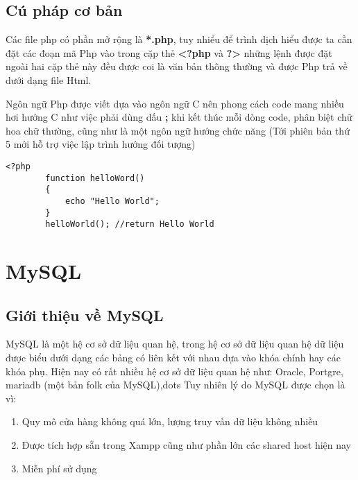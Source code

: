 \subsection{Cú pháp cơ bản}
Các file php có phần mở rộng là \textbf{*.php}, tuy nhiểu để trình dịch hiểu được ta cần đặt các đoạn mã Php vào trong cặp thẻ \textbf{<?php} và \textbf{?>} những lệnh được đặt ngoài hai cặp thẻ này đều được coi là văn bản thông thường và được Php trả về dưới dạng file Html.\par
Ngôn ngữ Php được viết dựa vào ngôn ngữ C nên phong cách code mang nhiều hơi hướng C như việc phải dùng dấu \textbf{;} khi kết thúc mỗi dòng code, phân biệt chữ hoa chữ thường, cũng như là một ngôn ngữ hướng chức năng (Tới phiên bản thứ 5 mới hỗ trợ việc lập trình hướng đối tượng)
\lstset{language=Php}
\begin{center}
	\vspace{-2em}
	\begin{lstlisting}[frame=single]
    <?php
        function helloWord()
        {
            echo "Hello World";
        }
        helloWorld(); //return Hello World
\end{lstlisting}
\end{center}
\section{MySQL}
\subsection{Giới thiệu về MySQL}
MySQL là một hệ cơ sở dữ liệu quan hệ, trong hệ cơ sở dữ liệu quan hệ dữ liệu được biểu dưới dạng các bảng có liên kết với nhau dựa vào khóa chính hay các khóa phụ. Hiện nay có rất nhiều hệ cơ sở dữ liệu quan hệ như: Oracle, Portgre, mariadb (một bản folk của MySQL),dots Tuy nhiên lý do MySQL được chọn là vì:
\begin{enumerate}
	\vspace{-1em}
	\itemsep0em
	\item Quy mô cửa hàng không quá lớn, lượng truy vấn dữ liệu không nhiều
	\item Được tích hợp sẵn trong Xampp cũng như phần lớn các shared host hiện nay
	\item Miễn phí sử dụng
\end{enumerate}
